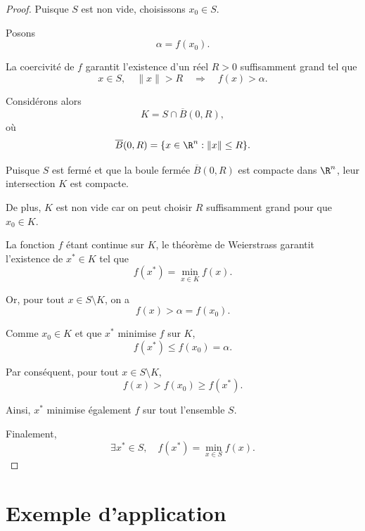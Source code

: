 \begin{proof}
Puisque $S$ est non vide, choisissons $x_0\in S$.

Posons
\[
\alpha=f(x_0).
\]

La coercivité de $f$ garantit l'existence d'un réel $R>0$ suffisamment grand tel que
\[
x\in S,\quad \|x\|>R
\quad\Longrightarrow\quad
f(x)>\alpha.
\]

Considérons alors
\[
K=S\cap\overline B(0,R),
\]
où
\[
\overline B(0,R)=\{x\in\R^n:\|x\|\leq R\}.
\]

Puisque $S$ est fermé et que la boule fermée $\overline B(0,R)$ est compacte dans $\R^n$, leur intersection $K$ est compacte.

De plus, $K$ est non vide car on peut choisir $R$ suffisamment grand pour que $x_0\in K$.

La fonction $f$ étant continue sur $K$, le théorème de Weierstrass garantit l'existence de $x^*\in K$ tel que
\[
f(x^*)=\min_{x\in K}f(x).
\]

Or, pour tout $x\in S\setminus K$, on a
\[
f(x)>\alpha=f(x_0).
\]

Comme $x_0\in K$ et que $x^*$ minimise $f$ sur $K$,
\[
f(x^*)\leq f(x_0)=\alpha.
\]

Par conséquent, pour tout $x\in S\setminus K$,
\[
f(x)>f(x_0)\geq f(x^*).
\]

Ainsi, $x^*$ minimise également $f$ sur tout l'ensemble $S$.

Finalement,
\[
\boxed{\exists x^*\in S,\quad
f(x^*)=\min_{x\in S}f(x).}
\]
\end{proof}

\section{Exemple d'application}

